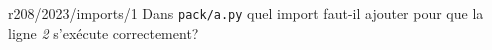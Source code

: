 \begin{question}{r208/2023/imports/1}
  Dans \texttt{pack/a.py} quel import faut-il ajouter pour que la ligne
  {\em 2} s'exécute correctement?
  \begin{reponses}
  \end{reponses}
\end{question}
